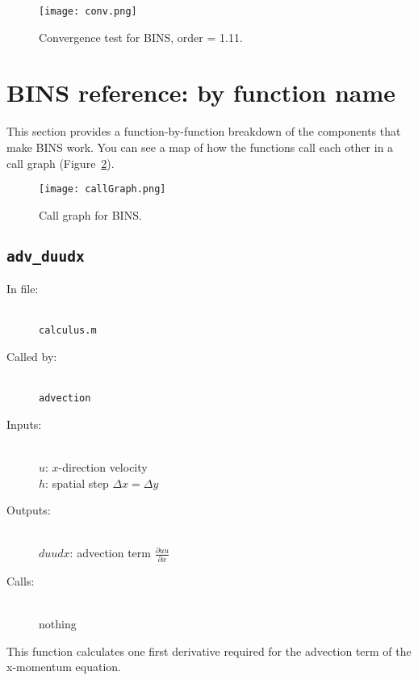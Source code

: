 \documentclass[12pt]{article}
\begin{document}
\begin{figure}
\center
\texttt{[image: conv.png]} 
\caption{Convergence test for BINS, order = 1.11.}
\label{conv}
\end{figure}


\FloatBarrier
\section{BINS reference: by function name}
This section provides a function-by-function breakdown of the components that make BINS work.  You can see a map of how the functions call each other in a call graph (Figure~\ref{callGraph}).

\begin{figure}
\center
\texttt{[image: callGraph.png]} 
\caption{Call graph for BINS.}
\label{callGraph}
\end{figure}

\subsection{\texttt{adv\_duudx}}
\begin{description}
\item[In file:] \hfill \\ \texttt{calculus.m}
\item[Called by:] \hfill \\ \texttt{advection}
\item[Inputs:] \hfill \\ $u$: $x$-direction velocity \\ $h$: spatial step $\Delta x = \Delta y$
\item[Outputs:] \hfill \\ $duudx$: advection term $\frac{\partial uu}{\partial x}$
\item[Calls:] \hfill \\ nothing
\end{description}
This function calculates one first derivative required for the advection term of the x-momentum equation.
\end{document}

